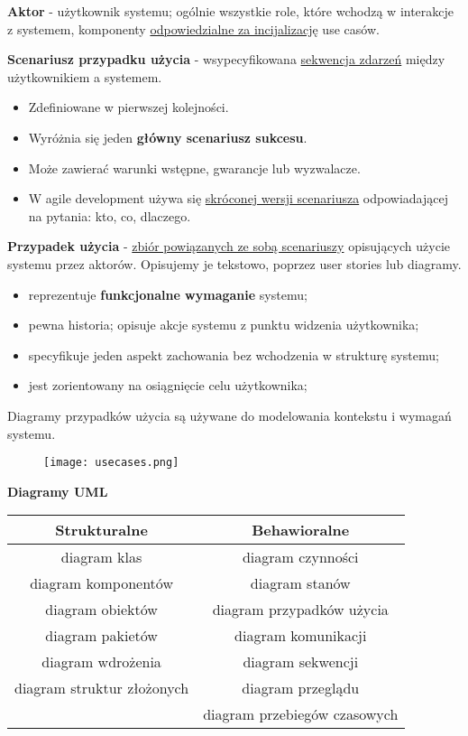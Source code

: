 \documentclass[a4paper]{article}
\begin{document}
    \textbf{Aktor} - użytkownik systemu; ogólnie wszystkie role, które wchodzą w interakcje z systemem, komponenty \underline{odpowiedzialne
    za incijalizację} use casów.

    \textbf{Scenariusz przypadku użycia} - wsypecyfikowana \underline{sekwencja zdarzeń} między użytkownikiem a systemem.
    \begin{itemize}
        \item Zdefiniowane w pierwszej kolejności.
        \item Wyróżnia się jeden \textbf{główny scenariusz sukcesu}.
        \item Może zawierać warunki wstępne, gwarancje lub wyzwalacze.
        \item W agile development używa się \underline{skróconej wersji scenariusza} odpowiadającej
        na pytania: kto, co, dlaczego.
    \end{itemize}

    \textbf{Przypadek użycia} - \underline{zbiór powiązanych ze sobą scenariuszy} opisujących użycie systemu przez aktorów.
    Opisujemy je tekstowo, poprzez user stories lub diagramy.
    \begin{itemize}
        \item reprezentuje \textbf{funkcjonalne wymaganie} systemu;
        \item pewna historia; opisuje akcje systemu z punktu widzenia użytkownika;
        \item specyfikuje jeden aspekt zachowania bez wchodzenia w strukturę systemu;
        \item jest zorientowany na osiągnięcie celu użytkownika;
    \end{itemize}
    Diagramy przypadków użycia są używane do modelowania kontekstu i wymagań systemu.

    \begin{figure}[h!]
        \texttt{[image: usecases.png]}
    \end{figure}

    \textbf{Diagramy UML}

    \begin{tabular}{|c|c|}
        \hline
        Strukturalne & Behawioralne\\
        \hline
        diagram klas & diagram czynności\\
        diagram komponentów & diagram stanów\\
        diagram obiektów & diagram przypadków użycia\\
        diagram pakietów & diagram komunikacji\\
        diagram wdrożenia & diagram sekwencji\\
        diagram struktur złożonych & diagram przeglądu \\
        & diagram przebiegów czasowych\\
        \hline
    \end{tabular}
\end{document}

